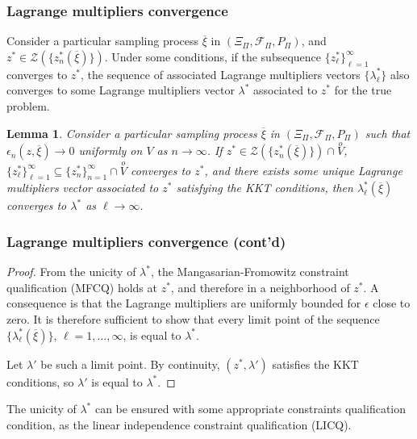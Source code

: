 \documentclass{beamer}
\newtheorem{lem}{Lemma}
\begin{document}
\begin{frame}
\frametitle{Lagrange multipliers convergence}

Consider a particular sampling process $\overline{\xi}$ in $(\Xi_{\Pi}, \mathcal{F}_{\Pi}, P_{\Pi})$, and $z^*
\in \mathcal{Z}\left(\lbrace z^*_n(\overline{\xi})\rbrace\right)$.
Under some conditions, if the subsequence $\lbrace z_{\ell}^* \rbrace_{\ell =  1}^{\infty}$ converges to $z^*$, the sequence of associated Lagrange multipliers vectors $\lbrace \lambda_{\ell}^* \rbrace$ also converges to some Lagrange multipliers vector $\lambda^*$ associated to $z^*$ for the true problem.

\mbox{}

\begin{lem}
Consider a particular sampling process
$\overline{\xi}$ in $(\Xi_{\Pi}, \mathcal{F}_{\Pi}, P_{\Pi})$ such that
$\epsilon_n \left( z, \overline{\xi} \right) \rightarrow 0$
uniformly on $V$ as $n \rightarrow \infty$.
If $z^* \in \mathcal{Z} \left(\lbrace
z^*_n(\overline{\xi})\rbrace\right) \cap \overset{o}{V}$, $\lbrace
z_{\ell}^* \rbrace_{\ell =  1}^{\infty} \subseteq \lbrace z_n^*
\rbrace_{n =  1}^{\infty} \cap \overset{o}{V}$ converges to $z^*$,
and there exists some unique Lagrange multipliers vector associated to $z^*$ satisfying the KKT conditions, then $\lambda^*_{\ell}(\overline{\xi})$ converges to $\lambda^*$ as $\ell \rightarrow \infty$.
\end{lem}

\end{frame}

\begin{frame}
\frametitle{Lagrange multipliers convergence (cont'd)}

\begin{proof}
From the unicity of $\lambda^*$, the Mangasarian-Fromowitz constraint qualification (MFCQ) holds at $z^*$, and therefore in a neighborhood of $z^*$.
A consequence is that the Lagrange multipliers are uniformly bounded for $\epsilon$ close to zero.
It is therefore sufficient to show that every limit point of the sequence $\lbrace \lambda^*_{\ell}(\overline{\xi}) \rbrace$, $\ell = 1,\ldots,\infty$, is equal to $\lambda^*$.

\mbox{}

Let $\lambda'$ be such a limit point.
By continuity, $(z^*, \lambda' )$ satisfies the KKT conditions, so $\lambda'$ is equal to $\lambda^*$.
\end{proof}

\mbox{}

The unicity of $\lambda^*$ can be ensured with some appropriate constraints qualification condition, as the  linear independence constraint qualification (LICQ).

\end{frame}
\end{document}
